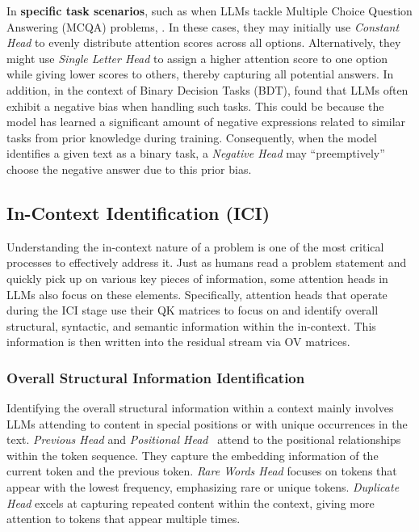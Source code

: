 \documentclass[12pt,letterpaper]{article}
\begin{document}
In \textbf{specific task scenarios}, such as when LLMs tackle Multiple Choice Question Answering (MCQA) problems, . In these cases, they may initially use \textit{Constant Head} to evenly distribute attention scores across all options. Alternatively, they might use \textit{Single Letter Head} to assign a higher attention score to one option while giving lower scores to others, thereby capturing all potential answers.\citep{CorrectLetterHead_23_arXiv_DeepMind}
In addition, in the context of Binary Decision Tasks (BDT),  \citet{NegativeHead_24_arXiv_SNU} found that LLMs often exhibit a negative bias when handling such tasks. This could be because the model has learned a significant amount of negative expressions related to similar tasks from prior knowledge during training. Consequently, when the model identifies a given text as a binary task, a \textit{Negative Head} may ``preemptively'' choose the negative answer due to this prior bias.



\subsection*{In-Context Identification (ICI)} \label{subsec:ICI}
Understanding the in-context nature of a problem is one of the most critical processes to effectively address it. Just as humans read a problem statement and quickly pick up on various key pieces of information, some attention heads in LLMs also focus on these elements. Specifically, attention heads that operate during the ICI stage use their QK matrices to focus on and identify overall structural, syntactic, and semantic information within the in-context. This information is then written into the residual stream via OV matrices.

\subsubsection*{Overall Structural Information Identification} \label{sucsubsec:overallstructure}
Identifying the overall structural information within a context mainly involves LLMs attending to content in special positions or with unique occurrences in the text.
\textit{Previous Head} \citep{InductionHeads_22_TCT_Anthropic,PreviousHead_23_AIForum_Google} and \textit{Positional Head}~\citep{InformationFlow_24_arXiv_Meta,SpecialHead_19_ACL_Russia,PositionalHead_18_ACL_Helsinki} attend to the positional relationships within the token sequence. They capture the embedding information of the current token and the previous token.
\textit{Rare Words Head} focuses on tokens that appear with the lowest frequency, emphasizing rare or unique tokens.\citep{SpecialHead_19_ACL_Russia}
\textit{Duplicate Head} excels at capturing repeated content within the context, giving more attention to tokens that appear multiple times.\citep{IOI_23_ICLR_Redwood}
\end{document}

